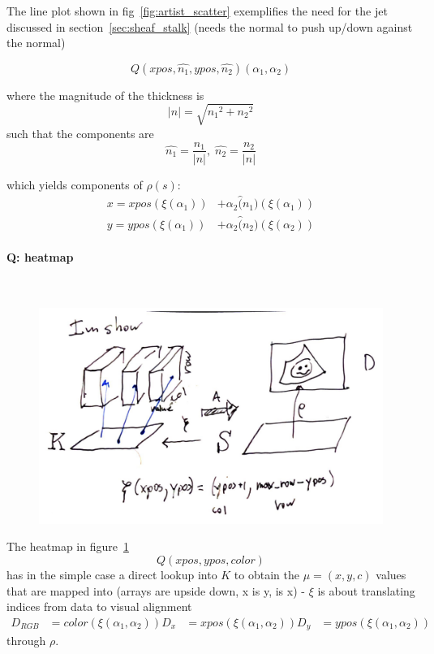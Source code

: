 \documentclass[../main.tex]{subfiles}
\begin{document}
The line plot shown in fig~\ref{fig:artist_scatter} exemplifies the need for the jet discussed in section~\ref{sec:sheaf_stalk}
(needs the normal to push up/down against the normal)

\begin{equation}
    Q(xpos, \hat{n_{1}}, ypos, \hat{n_{2}})(\alpha_1, \alpha_2)
\end{equation}

where the magnitude of the thickness is 
\begin{equation}
    \lvert n \rvert = \sqrt{{n_{1}}^2 + {n_{2}}^2}
\end{equation}
such that the components are 
\begin{equation}
    \hat{n_{1}} = \frac{n_1}{\lvert n \rvert}, \; \hat{n_{2}} = \frac{n_2}{\lvert n \rvert}
\end{equation}
    
which yields components of $\rho(s)$:
\begin{align}
 x = xpos(\xi(\alpha_1)) &+ \alpha_2\hat(n_1)(\xi(\alpha_1)) \\
 y = ypos(\xi(\alpha_1)) &+ \alpha_2\hat(n_2)(\xi(\alpha_2)) 
\end{align}


\paragraph{Q: heatmap}\mbox{} \\
\label{sec:artist_example_heatmap}
\begin{figure}[H]
    \includegraphics[width=\textwidth]{figures/math/heatmap.png}
    \label{fig:artist_heatmap}
\end{figure}
The heatmap in figure~\ref{fig:artist_heatmap} 
\begin{equation}
Q(xpos, ypos, color)
\end{equation}
has in the simple case a direct lookup into $K$ to obtain the $\mu = (x,y,c)$ values that are mapped into 
(arrays are upside down, x is y, is x) - $\xi$ is about translating indices from data to visual alignment
\begin{align}
D_{RGB} &= color(\xi(\alpha_1, \alpha_2))
D_x & = xpos(\xi(\alpha_1, \alpha_2))
D_y &= ypos(\xi(\alpha_1, \alpha_2))
\end{align}
through $\rho$. 
\end{document}
